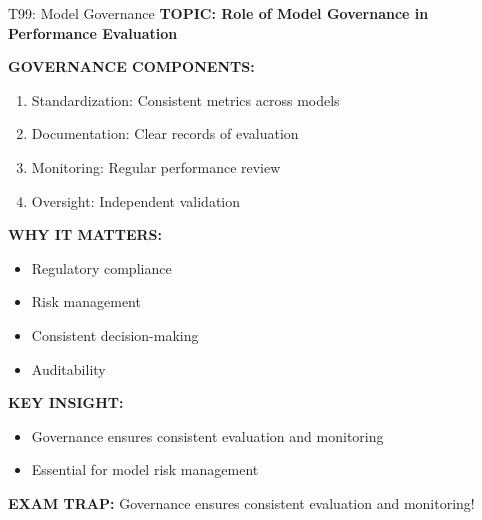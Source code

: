 \documentclass[8pt]{beamer}
\begin{document}
	\begin{frame}{T99: Model Governance}
		\fontsize{6.5}{7.5}\selectfont
		\textbf{TOPIC: Role of Model Governance in Performance Evaluation}
		
		\vspace{0.1cm}
		\textbf{GOVERNANCE COMPONENTS:}
		\begin{enumerate}
			\item \textcolor{myblue}{Standardization:} Consistent metrics across models
			\item \textcolor{myblue}{Documentation:} Clear records of evaluation
			\item \textcolor{myblue}{Monitoring:} Regular performance review
			\item \textcolor{myblue}{Oversight:} Independent validation
		\end{enumerate}
		
		\vspace{0.1cm}
		\textbf{WHY IT MATTERS:}
		\begin{itemize}
			\item Regulatory compliance
			\item Risk management
			\item Consistent decision-making
			\item Auditability
		\end{itemize}
		
		\vspace{0.1cm}
		\textbf{KEY INSIGHT:}
		\begin{itemize}
			\item Governance ensures consistent evaluation and monitoring
			\item Essential for model risk management
		\end{itemize}
		
		\textcolor{myred}{\textbf{EXAM TRAP:}} Governance ensures \textcolor{myblue}{consistent evaluation and monitoring}!
	\end{frame}
	
\end{document}
